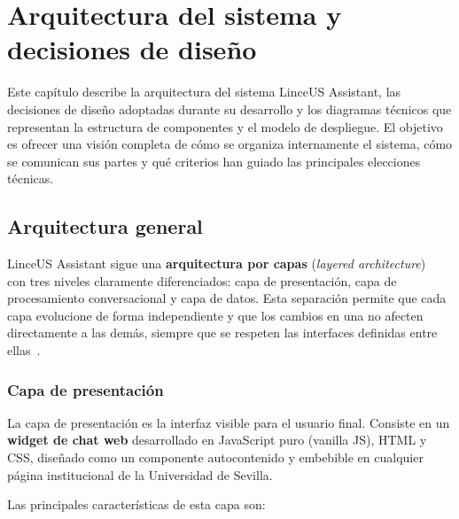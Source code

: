 
\chapter{Arquitectura del sistema y decisiones de diseño}\label{cap:arquitectura}

Este capítulo describe la arquitectura del sistema LinceUS Assistant, las decisiones de diseño adoptadas durante su desarrollo y los diagramas técnicos que representan la estructura de componentes y el modelo de despliegue. El objetivo es ofrecer una visión completa de cómo se organiza internamente el sistema, cómo se comunican sus partes y qué criterios han guiado las principales elecciones técnicas.


\section{Arquitectura general}\label{sec:arq-general}

LinceUS Assistant sigue una \textbf{arquitectura por capas} (\textit{layered architecture})~\cite{bass2021sap} con tres niveles claramente diferenciados: capa de presentación, capa de procesamiento conversacional y capa de datos. Esta separación permite que cada capa evolucione de forma independiente y que los cambios en una no afecten directamente a las demás, siempre que se respeten las interfaces definidas entre ellas~\cite{martin2017clean}.

\subsection{Capa de presentación}\label{subsec:capa-presentacion}

La capa de presentación es la interfaz visible para el usuario final. Consiste en un \textbf{widget de chat web} desarrollado en JavaScript puro (vanilla JS), HTML y CSS, diseñado como un componente autocontenido y embebible en cualquier página institucional de la Universidad de Sevilla.

Las principales características de esta capa son:

